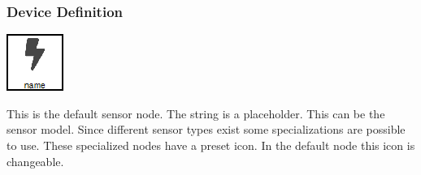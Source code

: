 \subsubsection{Device Definition}
\noindent\begin{minipage}{0.15\textwidth}%
	\includegraphics[width=\linewidth]{assets/images/sensor7}
\end{minipage}%
\hfill%
\begin{minipage}{0.8\textwidth}
	This is the default sensor node. The string  is a placeholder. This can be the sensor model. Since different sensor types exist some specializations are possible to use. These specialized nodes have a preset icon. In the default node this icon is changeable.
\end{minipage}

